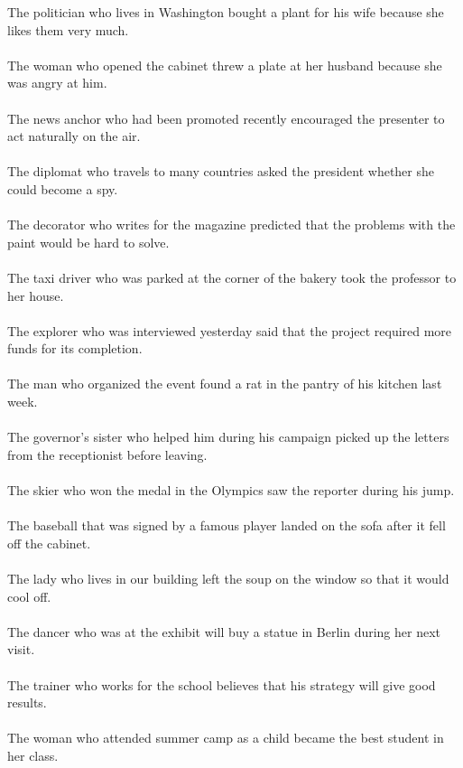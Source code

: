 The politician who lives in Washington bought a plant for his wife because she likes them very much.	\\	\\
The woman who opened the cabinet threw a plate at her husband because she was angry at him.	\\	\\
The news anchor who had been promoted recently encouraged the presenter to act naturally on the air.	\\	\\
The diplomat who travels to many countries asked the president whether she could become a spy.	\\	\\
The decorator who writes for the magazine predicted that the problems with the paint would be hard to solve.	\\	\\
The taxi driver who was parked at the corner of the bakery took the professor to her house.	\\	\\
The explorer who was interviewed yesterday said that the project required more funds for its completion.	\\	\\
The man who organized the event found a rat in the pantry of his kitchen last week.	\\	\\
The governor's sister who helped him during his campaign picked up the letters from the receptionist before leaving.	\\	\\
The skier who won the medal in the Olympics saw the reporter during his jump.	\\	\\
The baseball that was signed by a famous player landed on the sofa after it fell off the cabinet.	\\	\\
The lady who lives in our building left the soup on the window so that it would cool off.	\\	\\
The dancer who was at the exhibit will buy a statue in Berlin during her next visit.	\\	\\
The trainer who works for the school believes that his strategy will give good results.	\\	\\
The woman who attended summer camp as a child became the best student in her class.	\\	\\
